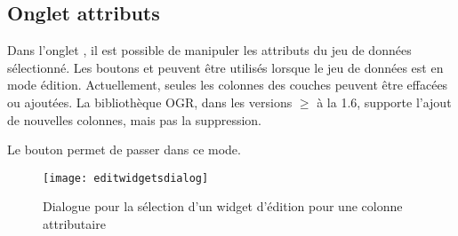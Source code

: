 \subsection{Onglet attributs}\label{label_attributes}
Dans l'onglet , il est possible de manipuler les attributs du jeu de données sélectionné. Les boutons  et  peuvent être utilisés lorsque le jeu de données est en mode édition. Actuellement, seules les colonnes des couches \pg peuvent être effacées ou ajoutées. La bibliothèque OGR, dans les versions $\geq$ à la 1.6, supporte l'ajout de nouvelles colonnes, mais pas la suppression.

Le bouton  permet de passer dans ce mode.


\begin{figure}[H]
   \begin{center}
   \texttt{[image: editwidgetsdialog]}
   \caption{Dialogue pour la sélection d'un widget d'édition pour une colonne attributaire \nixcaption}\label{fig:editwidget}
\end{center}
\end{figure}

